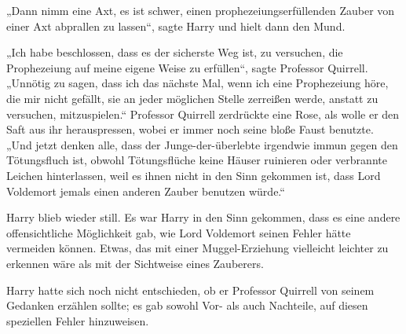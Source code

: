 „Dann nimm eine Axt, es ist schwer, einen prophezeiungserfüllenden Zauber von einer Axt abprallen zu lassen“, sagte Harry und hielt dann den Mund.

„Ich habe beschlossen, dass es der sicherste Weg ist, zu versuchen, die Prophezeiung auf meine eigene Weise zu erfüllen“, sagte Professor Quirrell.
„Unnötig zu sagen, dass ich das nächste Mal, wenn ich eine Prophezeiung höre, die mir nicht gefällt, sie an jeder möglichen Stelle zerreißen werde, anstatt zu versuchen, mitzuspielen.“
Professor Quirrell zerdrückte eine Rose, als wolle er den Saft aus ihr herauspressen, wobei er immer noch seine bloße Faust benutzte.
„Und jetzt denken alle, dass der Junge-der-überlebte irgendwie immun gegen den Tötungsfluch ist, obwohl Tötungsflüche keine Häuser ruinieren oder verbrannte Leichen hinterlassen, weil es ihnen nicht in den Sinn gekommen ist, dass Lord Voldemort jemals einen anderen Zauber benutzen würde.“

Harry blieb wieder still. Es war Harry in den Sinn gekommen, dass es eine andere offensichtliche Möglichkeit gab, wie Lord Voldemort seinen Fehler hätte vermeiden können. Etwas, das mit einer Muggel-Erziehung vielleicht leichter zu erkennen wäre als mit der Sichtweise eines Zauberers.

Harry hatte sich noch nicht entschieden, ob er Professor Quirrell von seinem Gedanken erzählen sollte; es gab sowohl Vor- als auch Nachteile, auf diesen speziellen Fehler hinzuweisen.

